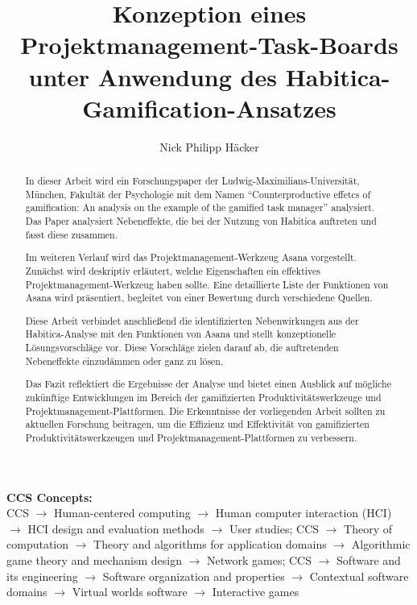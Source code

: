 \documentclass[sigconf, nonacm]{acmart}
\newcommand\holopagestyle{plain}
\begin{document}
\title{Konzeption eines Projektmanagement-Task-Boards unter Anwendung des Habitica-Gamification-Ansatzes}

\author{Nick Philipp Häcker}




\begin{abstract}
In dieser Arbeit wird ein Forschungspaper der Ludwig-Maximilians-Universität, München, Fakultät der Psychologie mit dem Namen \enquote{Counterproductive effetcs of gamification: An analysis \allowbreak on the example of the gamified task manager} analysiert. Das Paper analysiert Nebeneffekte, die bei der Nutzung von Habitica auftreten und fasst diese zusammen.

Im weiteren Verlauf wird das Projektmanagement-Werkzeug Asana vorgestellt. Zunächst wird deskriptiv erläutert, welche Eigenschaften ein effektives Projektmanagement-Werkzeug haben sollte. Eine detaillierte Liste der Funktionen von Asana wird präsentiert, begleitet von einer Bewertung durch verschiedene Quellen.

Diese Arbeit verbindet anschließend die identifizierten Nebenwirkungen aus der Habitica-Analyse mit den Funktionen von Asana und stellt konzeptionelle Lösungsvorschläge vor. Diese Vorschläge zielen darauf ab, die auftretenden Nebeneffekte einzudämmen oder ganz zu lösen.

Das Fazit reflektiert die Ergebnisse der Analyse und bietet einen Ausblick auf mögliche zukünftige Entwicklungen im Bereich der gamifizierten Produktivitätswerkzeuge und Projektmanagement-Plattformen. Die Erkenntnisse der vorliegenden Arbeit sollten zu aktuellen Forschung beitragen, um die Effizienz und Effektivität von gamifizierten Produktivitätswerkzeugen und Projektmanagement-Plattformen zu verbessern.
\end{abstract}

\maketitle

\pagestyle{\holopagestyle}
\begingroup\small\noindent\raggedright\textbf{CCS Concepts:}\\
CCS $\rightarrow$ Human-centered computing $\rightarrow$ Human computer interaction (HCI) $\rightarrow$ HCI design and evaluation methods $\rightarrow$ User studies;
CCS $\rightarrow$ Theory of computation $\rightarrow$ Theory and algorithms for application domains $\rightarrow$ Algorithmic game theory and mechanism design $\rightarrow$ Network games; CCS $\rightarrow$ Software and its engineering $\rightarrow$ Software organization and properties $\rightarrow$ Contextual software domains $\rightarrow$ Virtual worlds software $\rightarrow$ Interactive games
\end{document}
